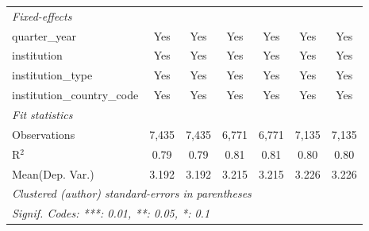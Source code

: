 \begin{tabular}{lcccccc}
   \midrule
   \emph{Fixed-effects}\\
   quarter\_year                      & Yes     & Yes         & Yes         & Yes     & Yes          & Yes\\  
   institution                        & Yes     & Yes         & Yes         & Yes     & Yes          & Yes\\  
   institution\_type                  & Yes     & Yes         & Yes         & Yes     & Yes          & Yes\\  
   institution\_country\_code         & Yes     & Yes         & Yes         & Yes     & Yes          & Yes\\  
   \midrule
   \emph{Fit statistics}\\
   Observations                       & 7,435   & 7,435       & 6,771       & 6,771   & 7,135        & 7,135\\  
   R$^2$                              & 0.79    & 0.79        & 0.81        & 0.81    & 0.80         & 0.80\\  
Mean(Dep. Var.) & 3.192 & 3.192 & 3.215 & 3.215 & 3.226 & 3.226 \\
   \midrule \midrule
   \multicolumn{7}{l}{\emph{Clustered (author) standard-errors in parentheses}}\\
   \multicolumn{7}{l}{\emph{Signif. Codes: ***: 0.01, **: 0.05, *: 0.1}}\\
\end{tabular}
\par\endgroup
